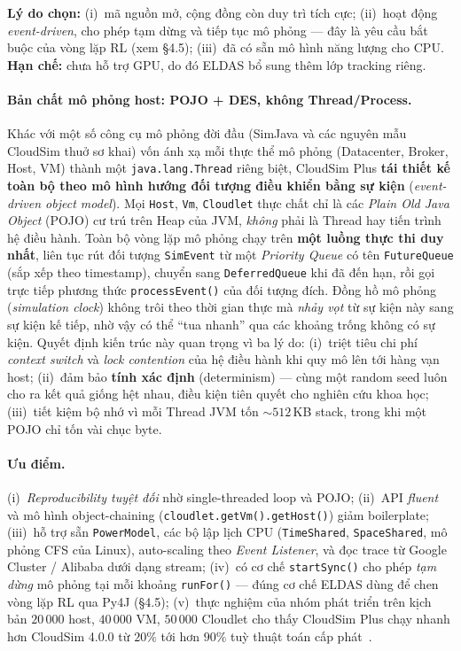 \textbf{Lý do chọn:} (i)~mã nguồn mở, cộng đồng còn duy trì tích cực;
(ii)~hoạt động \textit{event-driven}, cho phép tạm dừng và tiếp tục mô
phỏng --- đây là yêu cầu bắt buộc của vòng lặp RL (xem §4.5);
(iii)~đã có sẵn mô hình năng lượng cho CPU. \textbf{Hạn chế:} chưa hỗ
trợ GPU, do đó ELDAS bổ sung thêm lớp tracking riêng.

\paragraph{Bản chất mô phỏng host: POJO + DES, không Thread/Process.}
Khác với một số công cụ mô phỏng đời đầu (SimJava và các nguyên mẫu
CloudSim thuở sơ khai) vốn ánh xạ mỗi thực thể mô phỏng
(Datacenter, Broker, Host, VM) thành một \texttt{java.lang.Thread}
riêng biệt, CloudSim Plus
\textbf{tái thiết kế toàn bộ theo mô hình hướng đối tượng điều khiển
bằng sự kiện} (\textit{event-driven object model}). Mọi
\texttt{Host}, \texttt{Vm}, \texttt{Cloudlet} thực chất chỉ là các
\textit{Plain Old Java Object} (POJO) cư trú trên Heap của JVM,
\emph{không} phải là Thread hay tiến trình hệ điều hành. Toàn bộ vòng
lặp mô phỏng chạy trên \textbf{một luồng thực thi duy nhất}, liên tục
rút đối tượng \texttt{SimEvent} từ một \textit{Priority Queue} có tên
\texttt{FutureQueue} (sắp xếp theo timestamp), chuyển sang
\texttt{DeferredQueue} khi đã đến hạn, rồi gọi trực tiếp phương thức
\texttt{processEvent()} của đối tượng đích. Đồng hồ mô phỏng
(\textit{simulation clock}) không trôi theo thời gian thực mà
\emph{nhảy vọt} từ sự kiện này sang sự kiện kế tiếp, nhờ vậy có thể
``tua nhanh'' qua các khoảng trống không có sự kiện. Quyết định kiến
trúc này quan trọng vì ba lý do: (i)~triệt tiêu chi phí
\textit{context switch} và \textit{lock contention} của hệ điều hành
khi quy mô lên tới hàng vạn host; (ii)~đảm bảo \textbf{tính xác định}
(determinism) --- cùng một random seed luôn cho ra kết quả giống hệt
nhau, điều kiện tiên quyết cho nghiên cứu khoa học; (iii)~tiết kiệm
bộ nhớ vì mỗi Thread JVM tốn $\sim 512$\,KB stack, trong khi một POJO
chỉ tốn vài chục byte.

\paragraph{Ưu điểm.} (i)~\textit{Reproducibility tuyệt đối} nhờ
single-threaded loop và POJO; (ii)~API \textit{fluent} và mô hình
object-chaining (\texttt{cloudlet.getVm().getHost()}) giảm boilerplate;
(iii)~hỗ trợ sẵn \texttt{PowerModel}, các bộ lập lịch CPU
(\texttt{TimeShared}, \texttt{SpaceShared}, mô phỏng CFS của Linux),
auto-scaling theo \textit{Event Listener}, và đọc trace từ Google
Cluster / Alibaba dưới dạng stream; (iv)~có cơ chế \texttt{startSync()}
cho phép \emph{tạm dừng} mô phỏng tại mỗi khoảng \texttt{runFor()} ---
đúng cơ chế ELDAS dùng để chen vòng lặp RL qua Py4J (§4.5);
(v)~thực nghiệm của nhóm phát triển trên kịch bản $20\,000$ host,
$40\,000$ VM, $50\,000$ Cloudlet cho thấy CloudSim Plus chạy nhanh hơn
CloudSim 4.0.0 từ $20\%$ tới hơn $90\%$ tuỳ thuật toán cấp
phát~\cite{cloudsimplus2024perf}.

